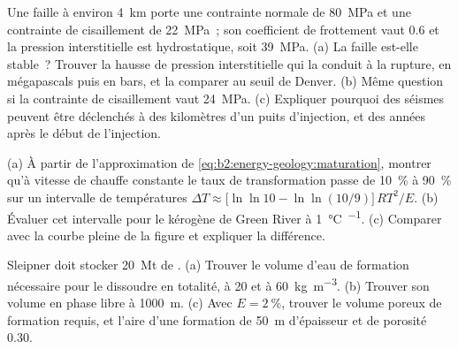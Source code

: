 \begin{exercise}[$\star\star\star$]\label{exo:b2:energy-geology:10}
Une faille à environ \qty{4}{km} porte une contrainte normale de \qty{80}{MPa} et une contrainte de cisaillement de
\qty{22}{MPa}~; son coefficient de frottement vaut 0.6 et la pression interstitielle est hydrostatique,
soit \qty{39}{MPa}. (a) La faille est-elle stable~? Trouver la hausse de pression interstitielle qui la conduit à la rupture, en
mégapascals puis en bars, et la comparer au seuil de Denver. (b) Même question si la contrainte de cisaillement vaut
\qty{24}{MPa}. (c) Expliquer pourquoi des séismes peuvent être déclenchés à des kilomètres d'un puits d'injection,
et des années après le début de l'injection.
\end{exercise}

\begin{exercise}[$\star\star\star$]\label{exo:b2:energy-geology:11}
(a) À partir de l'approximation de \eqref{eq:b2:energy-geology:maturation}, montrer qu'à vitesse de chauffe constante le taux de transformation
passe de \qty{10}{\percent} à \qty{90}{\percent} sur un intervalle de températures
$\Delta T \approx \bigl[\ln\ln 10 - \ln\ln(10/9)\bigr]\,RT^2/E$. (b) Évaluer cet intervalle
pour le kérogène de Green River à \qty{1}{\celsius\per\Ma}. (c) Comparer avec la courbe pleine de la
figure et expliquer la différence.
\end{exercise}

\begin{exercise}[$\star\star\star$]\label{exo:b2:energy-geology:12}
Sleipner doit stocker \qty{20}{Mt} de . (a) Trouver le volume d'eau de formation nécessaire pour le dissoudre en totalité, à 20 et à
\qty{60}{kg.m^{-3}}. (b) Trouver son volume en phase libre à
\qty{1000}{m}. (c) Avec $E = \qty{2}{\percent}$, trouver le volume poreux de formation requis, et
l'aire d'une formation de \qty{50}{m} d'épaisseur et de porosité 0.30.
\end{exercise}

